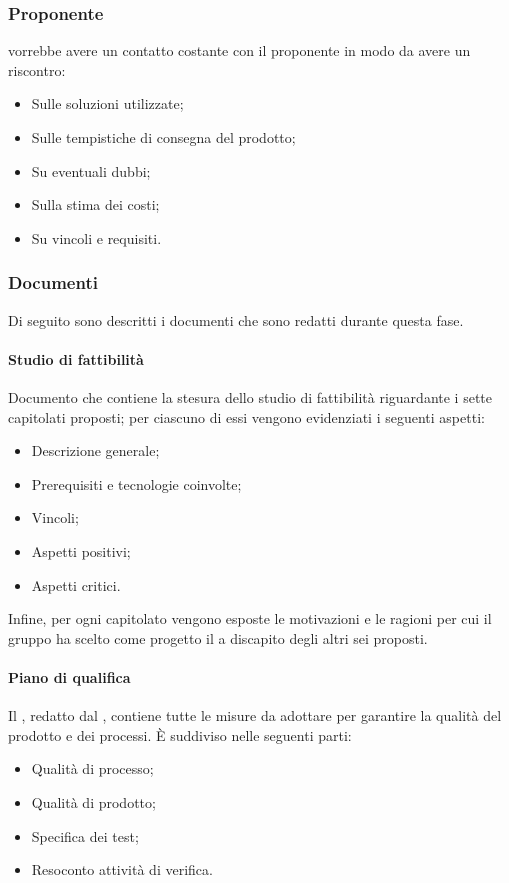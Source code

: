 \subsubsection{Proponente}
\Gruppo{} vorrebbe avere un contatto costante con il proponente in modo da avere un riscontro:
\begin{itemize}
\item Sulle soluzioni utilizzate;
\item Sulle tempistiche di consegna del prodotto;
\item Su eventuali dubbi;
\item Sulla stima dei costi;
\item Su vincoli e requisiti.
\end{itemize}
\subsubsection{Documenti}
Di seguito sono descritti i documenti che sono redatti durante questa fase.
\paragraph{Studio di fattibilità}
Documento che contiene la stesura dello studio di fattibilità riguardante i sette capitolati proposti; per ciascuno di essi vengono evidenziati i seguenti aspetti:
\begin{itemize}
    \item Descrizione generale;
    \item Prerequisiti e tecnologie coinvolte;
    \item Vincoli;
    \item Aspetti positivi;
    \item Aspetti critici.
\end{itemize}
Infine, per ogni capitolato vengono esposte le motivazioni e le ragioni per cui il gruppo ha scelto come progetto il  \NomeProgetto{} a discapito degli altri sei proposti.\\
\paragraph{Piano di qualifica}
Il \PdQ{}, redatto dal , contiene tutte le misure da adottare per garantire la qualità del prodotto e dei processi. È suddiviso nelle seguenti parti:
\begin{itemize}
\item Qualità di processo;
\item Qualità di prodotto;
\item Specifica dei test;
\item Resoconto attività di verifica.
\end{itemize} 
